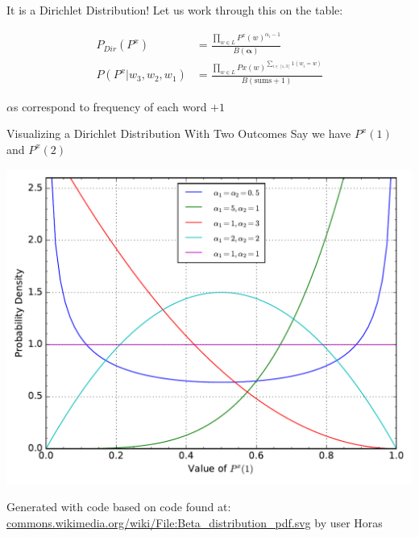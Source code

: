 \documentclass[11pt]{beamer}
\begin{document}
	\begin{frame}{It is a Dirichlet Distribution!}
		Let us work through this on the table:
	
		\begin{align*}
			P_{Dir}(P^x) & = \frac{\prod_{w \in L} P^{x}(w)^{\alpha_i - 1}}{B(\boldsymbol{\alpha})} \\
			P(P^x \vert w_3,w_2,w_1) & = \frac{\prod_{w \in L} P{x}(w)^{\sum_{i \in [1,3]} 1(w_i = w)}}{B(\text{sums}+1)}
		\end{align*}
		
		\vspace{10pt} $\alpha$s correspond to frequency of each word $+1$
	\end{frame}	
	
	\begin{frame}{Visualizing a Dirichlet Distribution With Two Outcomes}
		Say we have $P^x(1)$ and $P^x(2)$
	
		\begin{center}
			\includegraphics[width=0.7\linewidth]{dirichlet_distribution_pdf}
		\end{center}
		
		\begin{tiny}
			Generated with code based on code found at: \url{commons.wikimedia.org/wiki/File:Beta_distribution_pdf.svg} by user Horas
		\end{tiny}
	\end{frame}
		
\end{document}
